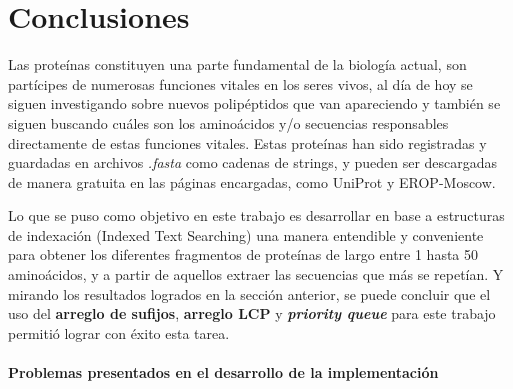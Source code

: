 \chapter*{Conclusiones}


Las proteínas constituyen una parte fundamental de la biología actual, son partícipes de numerosas funciones vitales en los seres vivos, al día de hoy se siguen investigando sobre nuevos polipéptidos que van apareciendo y también se siguen buscando cuáles son los aminoácidos y/o secuencias responsables directamente de estas funciones vitales. Estas proteínas han sido registradas y guardadas en archivos \textit{.fasta} como cadenas de strings, y pueden ser descargadas de manera gratuita en las páginas encargadas, como UniProt y EROP-Moscow.

Lo que se puso como objetivo en este trabajo es desarrollar en base a estructuras de indexación (Indexed Text Searching) una manera entendible y conveniente para obtener los diferentes fragmentos de proteínas de largo entre 1 hasta 50 aminoácidos, y a partir de aquellos extraer las secuencias que más se repetían. Y mirando los resultados logrados en la sección anterior, se puede concluir que el uso del \textbf{arreglo de sufijos}, \textbf{arreglo LCP} y \textbf{\textit{priority queue}} para este trabajo permitió lograr con éxito esta tarea.

\subsubsection{Problemas presentados en el desarrollo de la implementación}

